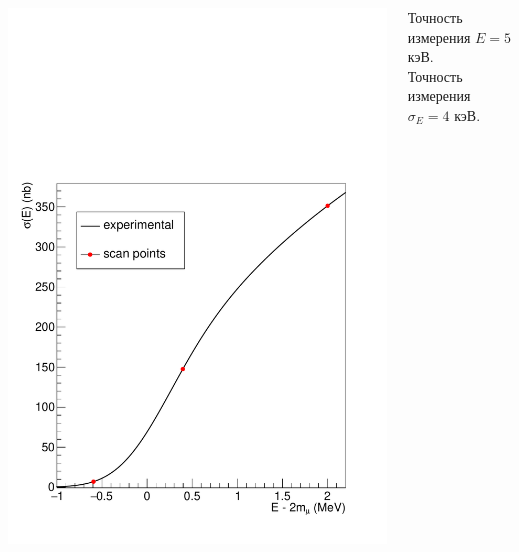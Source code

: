\documentclass[10pt, pdf, hyperref={unicode}]{beamer}
\begin{document}
\begin{frame}
\begin{minipage}{\linewidth}
\begin{columns}
\begin{column}{0.6\linewidth}
\centering
\includegraphics[scale = 0.38]{scan.pdf}
\par
\end{column}

\begin{column}{0.4\linewidth}
\fontsize{7pt}{10}\selectfont
Точность измерения $E = 5$ кэВ.\\
Точность измерения $\sigma_E = 4$ кэВ.
\end{column}
\end{columns}
\end{minipage}
\end{frame}
\end{document}

